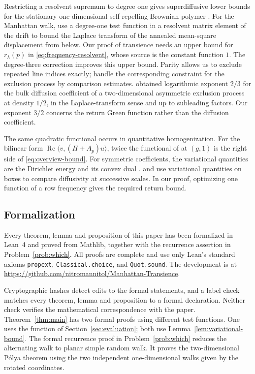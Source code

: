 \documentclass[11pt]{amsart}
\theoremstyle{plain}
\theoremstyle{definition}
\newcommand{\1}{\mathbf 1}
\newcommand{\ip}[2]{\langle #1,#2\rangle}
\begin{document}
Restricting a resolvent supremum to degree one gives superdiffusive lower
bounds for the stationary one-dimensional self-repelling Brownian polymer
\citep*[(92) and (98)--(100)]{TTV12}.
For the Manhattan walk, \citet*[(1.7), (2.1), and Lemma~2.1]{LTV18}
use a degree-one test function in a resolvent matrix element of the drift
to bound the Laplace transform of the annealed mean-square displacement
from below.  Our proof of transience needs an upper bound for $r_\lambda(p)$ in
\eqref{eq:frequency-resolvent}, whose source is the constant function $1$.
The degree-three correction improves this upper bound.  Parity allows us to exclude repeated line
indices exactly; \citet*[Sections~3--4]{LQSY04} handle the corresponding
constraint for the exclusion process by comparison estimates.
\citet*[Theorems~1.1--1.2 and (1.5)]{Yau04} obtained logarithmic exponent
$2/3$ for the bulk diffusion coefficient of a two-dimensional asymmetric
exclusion process at density $1/2$, in the Laplace-transform sense and up
to subleading factors.  Our exponent $3/2$ concerns the return Green function rather than
the diffusion coefficient.

The same quadratic functional occurs in quantitative homogenization.
For the bilinear form $\operatorname{Re}\ip v{(H+A_p)u}$, twice the
functional of \citet*[Exercise~10.1, immediately before (10.13)]{AKM19}
at $(g,1)$ is the right side of \eqref{eq:overview-bound}.
For symmetric coefficients, the variational quantities are the Dirichlet
energy and its convex dual \citep*[(2.1)--(2.2)]{AS16}
\citep*[(2.6)--(2.9)]{AKM19}.
\citet*[(2.4)--(2.5)]{ABK24} and \citet*[(2.32)--(2.37)]{ABK26} use
variational quantities on boxes to compare diffusivity at successive
scales.  In our proof, optimizing one function of a row frequency gives
the required return bound.

\subsection{Formalization}\label{ssec:formalization}

Every theorem, lemma and proposition of this paper has been formalized in
Lean~4 and proved from Mathlib, together with the recurrence assertion in
Problem~\ref{prob:which}.  All proofs are complete and use only Lean's
standard axioms \texttt{propext}, \texttt{Classical.choice}, and
\texttt{Quot.sound}.  The development is at
\url{https://github.com/nitromannitol/Manhattan-Transience}.

Cryptographic hashes detect edits to the formal statements, and a label
check matches every theorem, lemma and proposition to a formal declaration.
Neither check verifies the mathematical correspondence with the paper.  Theorem~\ref{thm:main} has two formal
proofs using different test functions.  One uses the function of
Section~\ref{sec:evaluation}; both use Lemma~\ref{lem:variational-bound}.
The formal recurrence proof in Problem~\ref{prob:which} reduces the
alternating walk to planar simple random walk.  It proves the
two-dimensional P\'olya theorem using the two independent one-dimensional
walks given by the rotated coordinates.
\end{document}
